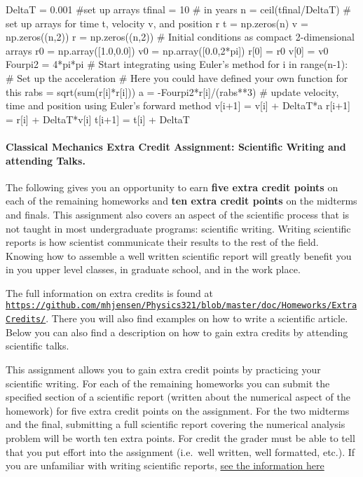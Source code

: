 \documentclass[%
oneside,                 %
final,                   %
10pt]{article}
\begin{document}
\bpycod
DeltaT = 0.001
#set up arrays 
tfinal = 10 # in years
n = ceil(tfinal/DeltaT)
# set up arrays for time t, velocity v, and position r
t = np.zeros(n)
v = np.zeros((n,2))
r = np.zeros((n,2))
# Initial conditions as compact 2-dimensional arrays
r0 = np.array([1.0,0.0])
v0 = np.array([0.0,2*pi])
r[0] = r0
v[0] = v0
Fourpi2 = 4*pi*pi
# Start integrating using Euler's method
for i in range(n-1):
    # Set up the acceleration
    # Here you could have defined your own function for this
    rabs = sqrt(sum(r[i]*r[i]))
    a =  -Fourpi2*r[i]/(rabs**3)
    # update velocity, time and position using Euler's forward method
    v[i+1] = v[i] + DeltaT*a
    r[i+1] = r[i] + DeltaT*v[i]
    t[i+1] = t[i] + DeltaT

\epycod


\paragraph{Classical Mechanics Extra Credit Assignment: Scientific Writing and attending Talks.}
The following gives you an opportunity to earn \textbf{five extra credit
points} on each of the remaining homeworks and \textbf{ten extra credit points}
on the midterms and finals.  This assignment also covers an aspect of
the scientific process that is not taught in most undergraduate
programs: scientific writing.  Writing scientific reports is how
scientist communicate their results to the rest of the field.  Knowing
how to assemble a well written scientific report will greatly benefit
you in you upper level classes, in graduate school, and in the work
place.

The full information on extra credits is found at \href{{https://github.com/mhjensen/Physics321/blob/master/doc/Homeworks/ExtraCredits/}}{\nolinkurl{https://github.com/mhjensen/Physics321/blob/master/doc/Homeworks/ExtraCredits/}}. There you will also find examples on how to write a scientific article. 
Below you can also find a description on how to gain extra credits by attending scientific talks.

This assignment allows you to gain extra credit points by practicing
your scientific writing.  For each of the remaining homeworks you can
submit the specified section of a scientific report (written about the
numerical aspect of the homework) for five extra credit points on the
assignment.  For the two midterms and the final, submitting a full
scientific report covering the numerical analysis problem will be
worth ten extra points.  For credit the grader must be able to tell
that you put effort into the assignment (i.e.~well written, well
formatted, etc.).  If you are unfamiliar with writing scientific
reports, \href{{https://github.com/mhjensen/Physics321/blob/master/doc/Homeworks/ExtraCredits/IntroductionScientificWriting.md}}{see the information here}
\end{document}
